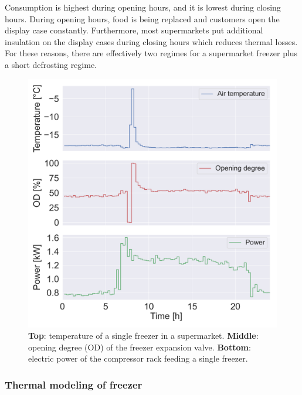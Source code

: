 \documentclass[11pt,a4paper]{article}
\begin{document}
Consumption is highest during opening hours, and it is lowest during closing hours.
During opening hours, food is being replaced and customers open the display case constantly.
Furthermore, most supermarkets put additional insulation on the display cases during closing hours which reduces thermal losses.
For these reasons, there are effectively two regimes for a supermarket freezer plus a short defrosting regime.

\begin{figure}[!t]
    \centering
    \includegraphics[width=\columnwidth]{figures/tmp_od_Pt.png}
    \caption{\textbf{Top}: temperature of a single freezer in a supermarket. \textbf{Middle}: opening degree (OD) of the freezer expansion valve. \textbf{Bottom}: electric power of the compressor rack feeding a single freezer.}
    \label{fig:chunk}
\end{figure}

\subsubsection{Thermal modeling of freezer}
\end{document}
